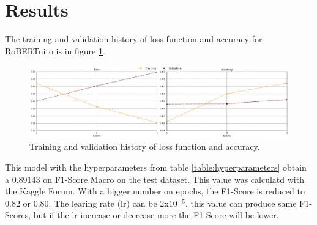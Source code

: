 \section{Results}

The training and validation history of loss function and accuracy for RoBERTuito is in figure \ref{fig:history}.

\begin{figure}[H]
    \centering
    \includegraphics[width=15cm]{Graphics/history.png}
    \caption{Training and validation history of loss function and accuracy.}
    \label{fig:history}
\end{figure}

This model with the hyperparameters from table \ref{table:hyperparameters} obtain a 0.89143 on F1-Score Macro on the test dataset. This value was calculatd with the Kaggle Forum. With a bigger number on epochs, the F1-Score is reduced to 0.82 or 0.80. The learing rate (lr) can be 2x10$^{-5}$, this value can produce same F1-Scores, but if the lr increase or decrease more the F1-Score will be lower.